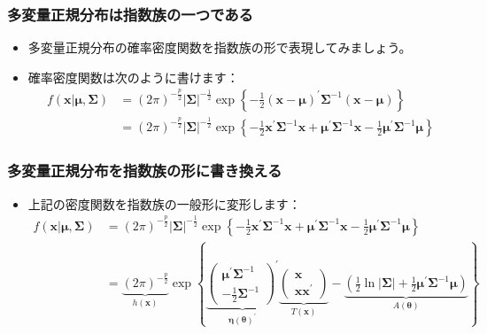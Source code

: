 \documentclass{beamer}
\begin{document}
\begin{frame}
\frametitle{多変量正規分布は指数族の一つである}
\begin{itemize}
    \item 多変量正規分布の確率密度関数を指数族の形で表現してみましょう。
    \item 確率密度関数は次のように書けます：
    \begin{align*}
    f(\bm{x}|\bm{\mu},\bm{\Sigma}) &= (2\pi)^{-\frac{p}{2}}|\bm{\Sigma}|^{-\frac{1}{2}}\exp\left\{-\frac{1}{2}(\bm{x}-\bm{\mu})^{\prime}\bm{\Sigma}^{-1}(\bm{x}-\bm{\mu})\right\} \\
    &= (2\pi)^{-\frac{p}{2}}|\bm{\Sigma}|^{-\frac{1}{2}}\exp\left\{-\frac{1}{2}\bm{x}^{\prime}\bm{\Sigma}^{-1}\bm{x}+\bm{\mu}^{\prime}\bm{\Sigma}^{-1}\bm{x}-\frac{1}{2}\bm{\mu}^{\prime}\bm{\Sigma}^{-1}\bm{\mu}\right\}
    \end{align*}
\end{itemize}
\end{frame}

\begin{frame}
\frametitle{多変量正規分布を指数族の形に書き換える}
\begin{itemize}
    \item 上記の密度関数を指数族の一般形に変形します：
    \begin{align*}
    f(\bm{x}|\bm{\mu},\bm{\Sigma}) &= (2\pi)^{-\frac{p}{2}}|\bm{\Sigma}|^{-\frac{1}{2}}\exp\left\{-\frac{1}{2}\bm{x}^{\prime}\bm{\Sigma}^{-1}\bm{x}+\bm{\mu}^{\prime}\bm{\Sigma}^{-1}\bm{x}-\frac{1}{2}\bm{\mu}^{\prime}\bm{\Sigma}^{-1}\bm{\mu}\right\} \\
    &= \underbrace{(2\pi)^{-\frac{p}{2}}}_{h(\bm{x})}\exp\left\{\underbrace{\begin{pmatrix}\bm{\mu}^{\prime}\bm{\Sigma}^{-1} \\ -\frac{1}{2}\bm{\Sigma}^{-1}\end{pmatrix}^{\prime}}_{\bm{\eta}(\bm{\theta})^{\prime}}\underbrace{\begin{pmatrix}\bm{x} \\ \bm{x}\bm{x}^{\prime}\end{pmatrix}}_{T(\bm{x})}-\underbrace{\left(\frac{1}{2}\ln|\bm{\Sigma}|+\frac{1}{2}\bm{\mu}^{\prime}\bm{\Sigma}^{-1}\bm{\mu}\right)}_{A(\bm{\theta})}\right\}
    \end{align*}
\end{itemize}
\end{frame}
\end{document}
